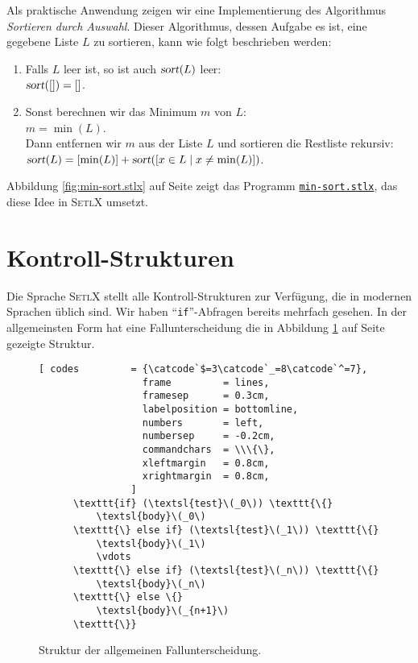 \noindent
Als praktische Anwendung zeigen wir eine Implementierung des Algorithmus 
\emph{Sortieren durch Auswahl}.  Dieser Algorithmus, dessen Aufgabe es ist, eine gegebene
Liste $L$ zu sortieren, kann wie folgt beschrieben werden:
\begin{enumerate}
\item Falls $L$ leer ist, so ist auch $\textsl{sort}(L)$ leer:
      \\[0.2cm]
      \hspace*{1.3cm}
      $\textsl{sort}([]) = []$.
\item Sonst berechnen wir das Minimum $m$ von $L$: 
      \\[0.2cm]
      \hspace*{1.3cm}
      $m = \min(L)$.
      \\[0.2cm]
      Dann entfernen wir $m$ aus der Liste $L$ und sortieren die Restliste rekursiv:
      \\[0.2cm]
      \hspace*{1.3cm}
      $\textsl{sort}(L) = [ \min(L) ] + \textsl{sort}([ x \in L \mid x \not= \min(L) ])$.
\end{enumerate}
Abbildung \ref{fig:min-sort.stlx} auf Seite \pageref{fig:min-sort.stlx} zeigt das Programm
\href{https://github.com/karlstroetmann/Logik/blob/master/SetlX/min-sort.stlx}{\texttt{min-sort.stlx}},
das diese Idee in \textsc{SetlX} umsetzt. 


\section{Kontroll-Strukturen}
Die Sprache \textsc{SetlX} stellt alle Kontroll-Strukturen zur Verfügung, die
 in modernen Sprachen üblich sind.  Wir haben  ``\texttt{if}''-Abfragen bereits mehrfach gesehen.
In der  allgemeinsten Form hat eine Fallunterscheidung die in Abbildung \ref{fig:if} auf Seite
\pageref{fig:if} gezeigte Struktur.
\begin{figure}[!ht]
\begin{Verbatim}[ codes         = {\catcode`$=3\catcode`_=8\catcode`^=7},
                  frame         = lines, 
                  framesep      = 0.3cm, 
                  labelposition = bottomline,
                  numbers       = left,
                  numbersep     = -0.2cm,
                  commandchars  = \\\{\},
                  xleftmargin   = 0.8cm,
                  xrightmargin  = 0.8cm,
                ]
      \texttt{if} (\textsl{test}\(_0\)) \texttt{\{}
          \textsl{body}\(_0\)
      \texttt{\} else if} (\textsl{test}\(_1\)) \texttt{\{}
          \textsl{body}\(_1\)
          \vdots
      \texttt{\} else if} (\textsl{test}\(_n\)) \texttt{\{}
          \textsl{body}\(_n\)
      \texttt{\} else \{}
          \textsl{body}\(_{n+1}\)
      \texttt{\}}
\end{Verbatim} 
\vspace*{-0.3cm}
\caption{Struktur der allgemeinen Fallunterscheidung.}  
\label{fig:if}
\end{figure} %


